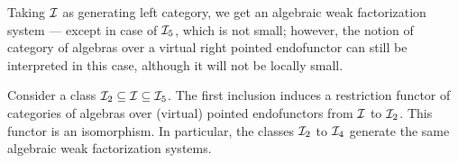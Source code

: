 \documentclass[reqno,10pt,a4paper,oneside]{amsart}
\begin{document}
Taking $\cal{I}$ as generating left category, we get an algebraic weak factorization system --- except in case of $\cal{I}_5$, which is not small; however, the notion of category of algebras over a virtual right pointed endofunctor can still be interpreted in this case, although it will not be locally small.



\begin{lemma}
Consider a class $\cal{I}_2 \subseteq \cal{I} \subseteq \cal{I}_5$.
The first inclusion induces a restriction functor of categories of algebras over (virtual) pointed endofunctors from $\cal{I}$ to $\cal{I}_2$.
This functor is an isomorphism.
In particular, the classes $\cal{I}_2$ to $\cal{I}_4$ generate the same algebraic weak factorization systems.
\end{lemma}
\end{document}
